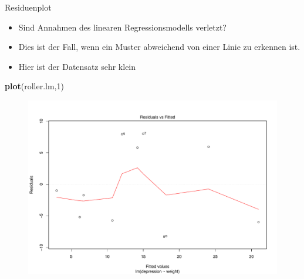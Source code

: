 \documentclass[ignorenonframetext,]{beamer}
\newenvironment{Shaded}{}{}
\newcommand{\KeywordTok}[1]{\textcolor[rgb]{0.00,0.44,0.13}{\textbf{{#1}}}}
\newcommand{\DecValTok}[1]{\textcolor[rgb]{0.25,0.63,0.44}{{#1}}}
\newcommand{\NormalTok}[1]{{#1}}
\providecommand{\tightlist}{%
\setlength{\itemsep}{0pt}\setlength{\parskip}{0pt}}
\begin{document}
\begin{frame}[fragile]{Residuenplot}

\begin{itemize}
\tightlist
\item
  Sind Annahmen des linearen Regressionsmodells verletzt?
\item
  Dies ist der Fall, wenn ein Muster abweichend von einer Linie zu
  erkennen ist.
\item
  Hier ist der Datensatz sehr klein
\end{itemize}

\begin{Shaded}
\begin{Highlighting}[]
\KeywordTok{plot}\NormalTok{(roller.lm,}\DecValTok{1}\NormalTok{)}
\end{Highlighting}
\end{Shaded}

\begin{figure}[htbp]
\centering
\includegraphics{RSocialScience2_files/figure-beamer/unnamed-chunk-70-1.pdf}
\caption{}
\end{figure}

\end{frame}
\end{document}
